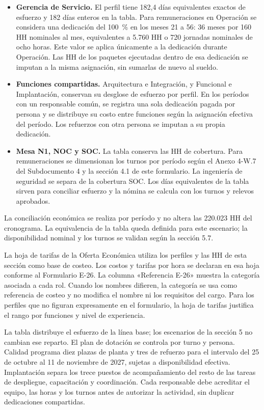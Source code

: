 \begin{itemize}
\item \textbf{Gerencia de Servicio.} El perfil tiene 182,4 días equivalentes exactos de esfuerzo y 182 días enteros en la tabla. Para remuneraciones en Operación se considera una dedicación del 100~\% en los meses 21 a 56: 36 meses por 160 HH nominales al mes, equivalentes a 5.760 HH o 720 jornadas nominales de ocho horas. Este valor se aplica únicamente a la dedicación durante Operación. Las HH de los paquetes ejecutadas dentro de esa dedicación se imputan a la misma asignación, sin sumarlas de nuevo al sueldo.
\item \textbf{Funciones compartidas.} Arquitectura e Integración, y Funcional e Implantación, conservan su desglose de esfuerzo por perfil. En los períodos con un responsable común, se registra una sola dedicación pagada por persona y se distribuye su costo entre funciones según la asignación efectiva del período. Los refuerzos con otra persona se imputan a su propia dedicación.
\item \textbf{Mesa N1, NOC y SOC.} La tabla conserva las HH de cobertura. Para remuneraciones se dimensionan los turnos por período según el Anexo 4-W.7 del Subdocumento 4 y la sección 4.1 de este formulario. La ingeniería de seguridad se separa de la cobertura SOC. Los días equivalentes de la tabla sirven para conciliar esfuerzo y la nómina se calcula con los turnos y relevos aprobados.
\end{itemize}

La conciliación económica se realiza por período y no altera las 220.023 HH del cronograma. La equivalencia de la tabla queda definida para este escenario; la disponibilidad nominal y los turnos se validan según la sección 5.7.

La hoja de tarifas de la Oferta Económica utiliza los perfiles y las HH de esta sección como base de costeo. Los costos y tarifas por hora se declaran en esa hoja conforme al Formulario E-26. La columna «Referencia E-26» muestra la categoría asociada a cada rol. Cuando los nombres difieren, la categoría se usa como referencia de costeo y no modifica el nombre ni los requisitos del cargo. Para los perfiles que no figuran expresamente en el formulario, la hoja de tarifas justifica el rango por funciones y nivel de experiencia.

La tabla distribuye el esfuerzo de la línea base; los escenarios de la sección 5 no cambian ese reparto. El plan de dotación se controla por turno y persona. Calidad programa diez plazas de planta y tres de refuerzo para el intervalo del 25 de octubre al 11 de noviembre de 2027, sujetas a disponibilidad efectiva. Implantación separa los trece puestos de acompañamiento del resto de las tareas de despliegue, capacitación y coordinación. Cada responsable debe acreditar el equipo, las horas y los turnos antes de autorizar la actividad, sin duplicar dedicaciones compartidas.

